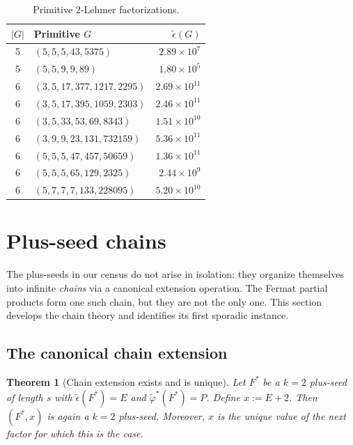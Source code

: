 \documentclass[11pt]{article}
\newtheorem{theorem}{Theorem}
\theoremstyle{definition}
\theoremstyle{remark}
\newcommand{\eps}{\tilde{\epsilon}}
\newcommand{\phist}{\tilde{\varphi}^*}
\begin{document}
\begin{table}[ht]
\centering
\caption{Primitive $2$-Lehmer factorizations.}\label{tab:primitives}
\smallskip
\begin{tabular}{@{}clr@{}}
\toprule
$|G|$ & Primitive $G$ & $\eps(G)$ \\
\midrule
5 & $(5, 5, 5, 43, 5375)$ & $2.89 \times 10^7$ \\
5 & $(5, 5, 9, 9, 89)$ & $1.80 \times 10^5$ \\
6 & $(3, 5, 17, 377, 1217, 2295)$ & $2.69 \times 10^{11}$ \\
6 & $(3, 5, 17, 395, 1059, 2303)$ & $2.46 \times 10^{11}$ \\
6 & $(3, 5, 33, 53, 69, 8343)$ & $1.51 \times 10^{10}$ \\
6 & $(3, 9, 9, 23, 131, 732159)$ & $5.36 \times 10^{11}$ \\
6 & $(5, 5, 5, 47, 457, 50659)$ & $1.36 \times 10^{11}$ \\
6 & $(5, 5, 5, 65, 129, 2325)$ & $2.44 \times 10^{9}$ \\
6 & $(5, 7, 7, 7, 133, 228095)$ & $5.20 \times 10^{10}$ \\
\bottomrule
\end{tabular}
\end{table}


\section{Plus-seed chains}\label{sec:plus-seed-chains}

The plus-seeds in our census do not arise in isolation: they organize
themselves into infinite \emph{chains} via a canonical extension
operation.  The Fermat partial products form one such chain, but they
are not the only one.  This section develops the chain theory and
identifies its first sporadic instance.

\subsection{The canonical chain extension}

\begin{theorem}[Chain extension exists and is unique]\label{thm:chain-existence}
Let $F^*$ be a $k = 2$ plus-seed of length $s$ with $\eps(F^*) = E$
and $\phist(F^*) = P$.  Define $x := E + 2$.  Then $(F^*, x)$ is again
a $k = 2$ plus-seed.  Moreover, $x$ is the unique value of the next
factor for which this is the case.
\end{theorem}
\end{document}
